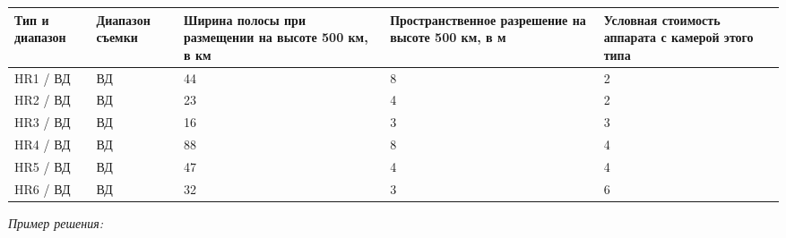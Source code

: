 \begin{table}[H]
    \begin{center}
        \begin{tabular}{|p{2cm}|p{2cm}|p{3cm}|p{3cm}|p{3cm}|}
            \hline Тип и диапазон &Диапазон съемки & Ширина полосы при размещении на высоте 500 км, в км & Пространственное разрешение на высоте 500 км, в м & Условная стоимость аппарата с камерой этого типа \\
            \hline
            HR1 / ВД & ВД & 44 & 8 & 2 \\
            \hline
            HR2 / ВД & ВД & 23 & 4 & 2 \\
            \hline
            HR3 / ВД & ВД & 16 & 3 & 3 \\
            \hline
            HR4 / ВД & ВД & 88 & 8 & 4 \\
            \hline
            HR5 / ВД & ВД & 47 & 4 & 4 \\
            \hline
            HR6 / ВД & ВД & 32 & 3 & 6 \\ 
            \hline
        \end{tabular}
    \end{center}
\end{table}

\textit{Пример решения:}






